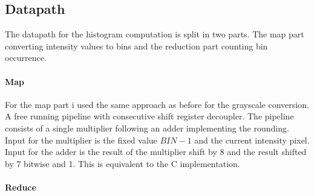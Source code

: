 \documentclass[a4paper]{scrartcl}
\begin{document}
\subsection{Datapath}

The datapath for the histogram computation is split in two parts. The map part converting intensity values to bins and the reduction part counting bin occurrence. 

\paragraph{Map}

For the map part i used the same approach as before for the grayscale conversion. A free running pipeline with consecutive shift register decoupler. The pipeline consists of a single multiplier following an adder implementing the rounding. Input for the multiplier is the fixed value $BIN-1$ and the current intensity pixel. Input for the adder is the result of the multiplier shift by 8 and the result shifted by 7 bitwise and 1. This is equivalent to the C implementation. 

\paragraph{Reduce}
\end{document}
